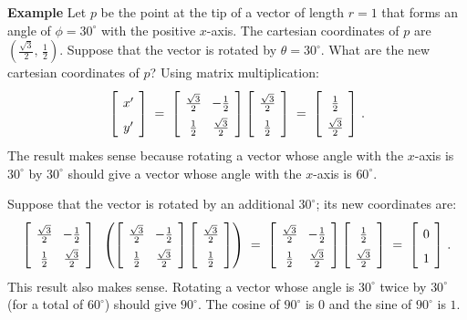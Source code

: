 \medskip

\noindent\textbf{Example} Let $p$ be the point at the tip of a vector of length $r=1$ that forms an angle of $\phi=30^{\circ}$ with the positive $x$-axis. The cartesian coordinates of $p$ are $\left(\frac{\sqrt{3}}{2},\,\frac{1}{2}\right)$. Suppose that the vector is rotated by $\theta=30^{\circ}$. What are the new cartesian coordinates of $p$? Using matrix multiplication:
\[
\spacearray
\left[\begin{array}{c}x'\\y'\end{array}\right]\;=\;
\left[\begin{array}{cc}\frac{\sqrt{3}}{2}&-\frac{1}{2}\\\frac{1}{2}&\frac{\sqrt{3}}{2}\end{array}\right]
\left[\begin{array}{c}\frac{\sqrt{3}}{2}\\\frac{1}{2}\end{array}\right]\;=\;
\left[\begin{array}{c}\frac{1}{2}\\\frac{\sqrt{3}}{2}\end{array}\right]\,.
\]
The result makes sense because rotating a vector whose angle with the $x$-axis is $30^{\circ}$ by $30^{\circ}$ should give a vector whose angle with the $x$-axis is $60^{\circ}$.

Suppose that the vector is rotated by an additional $30^{\circ}$; its new coordinates are:
\begin{equation}\label{eq.rotate1}
\spacearray
\left[\begin{array}{cc}\frac{\sqrt{3}}{2}&-\frac{1}{2}\\\frac{1}{2}&\frac{\sqrt{3}}{2}\end{array}\right]\;\;
\left(\left[\begin{array}{cc}\frac{\sqrt{3}}{2}&-\frac{1}{2}\\\frac{1}{2}&\frac{\sqrt{3}}{2}\end{array}\right]
\left[\begin{array}{c}\frac{\sqrt{3}}{2}\\\frac{1}{2}\end{array}\right]\right)\;=\;
\left[\begin{array}{cc}\frac{\sqrt{3}}{2}&-\frac{1}{2}\\\frac{1}{2}&\frac{\sqrt{3}}{2}\end{array}\right]
\left[\begin{array}{c}\frac{1}{2}\\\frac{\sqrt{3}}{2}\end{array}\right]\;=\;
\left[\begin{array}{c}0\\1\end{array}\right]\,.
\end{equation}
This result also makes sense. Rotating a vector whose angle is $30^{\circ}$ twice by $30^{\circ}$ (for a total of $60^\circ$) should give $90^{\circ}$. The cosine of $90^{\circ}$ is $0$ and the sine of $90^{\circ}$ is $1$.

